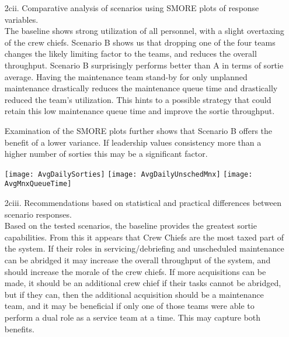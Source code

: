 \documentclass[answers]{exam}
\begin{document}
\begin{questions}
\begin{enumerate}
\begin{solution}
\begin{enumerate}
		\item[2cii.] Comparative analysis of scenarios using SMORE plots of response variables.\\
			The baseline shows strong utilization of all personnel, 
			with a slight overtaxing of the crew chiefs.
			Scenario B shows us that dropping one of the four teams
			changes the likely limiting factor to the teams, and reduces the overall throughput.
			Scenario B surprisingly performs better than A in terms of sortie average.
			Having the maintenance team stand-by for only unplanned maintenance drastically 
			reduces the maintenance queue time and drastically reduced the team's utilization.
			This hints to a possible strategy that could retain this low maintenance
			queue time and improve the sortie throughput.
			
			Examination of the SMORE plots further shows that Scenario B
			offers the benefit of a lower variance.
			If leadership values consistency more than a higher number of
			sorties this may be a significant factor.
			
			
			
			\begin{center}
				\texttt{[image: AvgDailySorties]} \bigskip
				\texttt{[image: AvgDailyUnschedMnx]} \bigskip
				\texttt{[image: AvgMnxQueueTime]}
			\end{center}
		
		\item[2ciii.] Recommendations based on statistical and practical differences between scenario responses. \\
			Based on the tested scenarios, the baseline provides the greatest sortie capabilities.
			From this it appears that Crew Chiefs are the most taxed part of the system.
			If their roles in servicing/debriefing and unscheduled maintenance can be abridged
			it may increase the overall throughput of the system, and should increase the morale
			of the crew chiefs.
			If more acquisitions can be made, it should be an additional crew chief if their tasks
			cannot be abridged, but if they can, then the additional acquisition should be a maintenance
			team, and it may be beneficial if only one of those teams were
			able to perform a dual role as a service team at a time.
			This may capture both benefits.
		
	\end{enumerate}	
	\end{solution}
\end{enumerate}


\end{questions}
\end{document}
